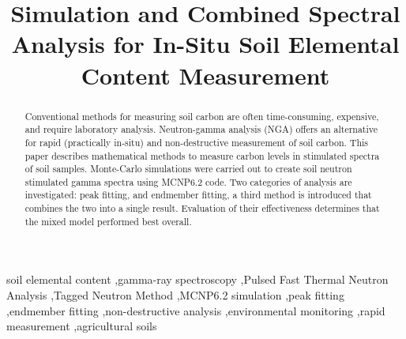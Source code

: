 \documentclass[preprint, 12pt, authoryear]{elsarticle}
\begin{document}
\linenumbers
\modulolinenumbers[2]

\begin{frontmatter}

\title{
    Simulation and Combined Spectral Analysis for In-Situ Soil Elemental Content Measurement
    }









\begin{abstract}

Conventional methods for measuring soil carbon are often time-consuming, expensive, and require laboratory analysis. Neutron-gamma analysis (NGA) offers an alternative for rapid (practically in-situ) and non-destructive measurement of soil carbon. This paper describes mathematical methods to measure carbon levels in stimulated spectra of soil samples. Monte-Carlo simulations were carried out to create soil neutron stimulated gamma spectra using MCNP6.2 code. Two categories of analysis are investigated: peak fitting, and endmember fitting, a third method is introduced that combines the two into a single result. Evaluation of their effectiveness determines that the mixed model performed best overall.

\end{abstract}
\begin{keyword}
soil elemental content \sep gamma-ray spectroscopy 
\sep Pulsed Fast Thermal Neutron Analysis \sep Tagged Neutron Method 
\sep MCNP6.2 simulation \sep peak fitting 
\sep endmember fitting \sep non-destructive analysis 
\sep environmental monitoring \sep rapid measurement 
\sep agricultural soils
\end{keyword}

\end{frontmatter}
\end{document}
